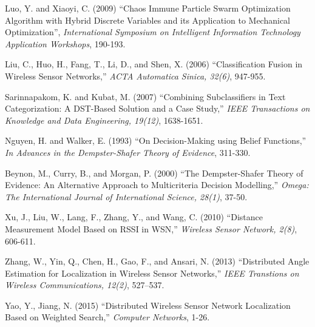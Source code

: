 \documentclass[12pt]{uthesis-v12}  %
\begin{document}
\begin{thebibliography}{00}
 Luo, Y. and Xiaoyi, C. (2009) ``Chaos Immune Particle Swarm Optimization Algorithm with Hybrid Discrete Variables and its Application to Mechanical Optimization'', {\it International Symposium on Intelligent Information Technology Application Workshops}, 190-193.

Liu, C., Huo, H., Fang, T., Li, D., and Shen, X. (2006) ``Classification Fusion in Wireless Sensor Networks,'' {\it ACTA Automatica Sinica, 32(6)}, 947-955.

Sarinnapakom, K. and Kubat, M. (2007) ``Combining Subclassifiers in Text Categorization: A DST-Based Solution and a Case Study,'' {\it IEEE Transactions on Knowledge and Data Engineering, 19(12)}, 1638-1651.


Nguyen, H. and Walker, E. (1993) ``On Decision-Making using Belief Functions,'' {\it In Advances in the Dempster-Shafer Theory of Evidence}, 311-330.

Beynon, M., Curry, B., and Morgan, P. (2000) ``The Dempster-Shafer Theory of Evidence: An Alternative Approach to Multicriteria Decision Modelling,'' {\it Omega: The International Journal of International Science, 28(1)}, 37-50.


Xu, J., Liu, W., Lang, F., Zhang, Y., and Wang, C. (2010) ``Distance Measurement Model Based on RSSI in WSN,'' {\it Wireless Sensor Network, 2(8)}, 606-611.

Zhang, W., Yin, Q., Chen, H., Gao, F., and Ansari, N. (2013) ``Distributed Angle Estimation for Localization in Wireless Sensor Networks,'' {\it IEEE Transtions on Wireless Communications, 12(2)}, 527--537.


Yao, Y., Jiang, N. (2015) ``Distributed Wireless Sensor Network Localization Based on Weighted Search,'' {\it Computer Networks}, 1-26.


\end{thebibliography}
\end{document}
